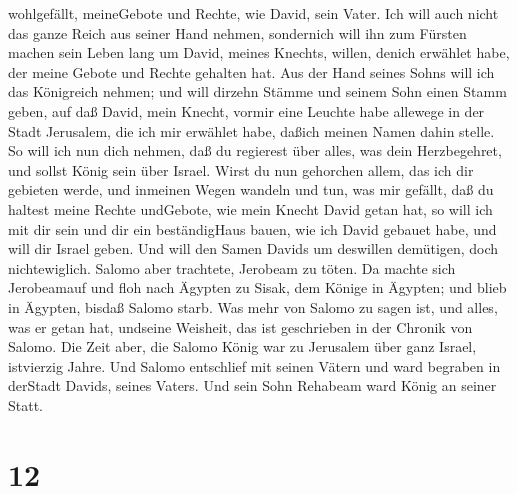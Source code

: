 wohlgefällt, meineGebote und Rechte, wie David, sein Vater.
 Ich will auch nicht das ganze Reich aus seiner Hand
nehmen, sondernich will ihn zum Fürsten machen sein Leben lang um David,
meines Knechts, willen, denich erwählet habe, der meine Gebote und
Rechte gehalten hat.  Aus der Hand seines Sohns will ich
das Königreich nehmen; und will dirzehn Stämme  und seinem
Sohn einen Stamm geben, auf daß David, mein Knecht, vormir eine Leuchte
habe allewege in der Stadt Jerusalem, die ich mir erwählet habe, daßich
meinen Namen dahin stelle.  So will ich nun dich nehmen,
daß du regierest über alles, was dein Herzbegehret, und sollst König
sein über Israel.  Wirst du nun gehorchen allem, das ich
dir gebieten werde, und inmeinen Wegen wandeln und tun, was mir gefällt,
daß du haltest meine Rechte undGebote, wie mein Knecht David getan hat,
so will ich mit dir sein und dir ein beständigHaus bauen, wie ich David
gebauet habe, und will dir Israel geben.  Und will den
Samen Davids um deswillen demütigen, doch nichtewiglich. 
Salomo aber trachtete, Jerobeam zu töten. Da machte sich Jerobeamauf und
floh nach Ägypten zu Sisak, dem Könige in Ägypten; und blieb in Ägypten,
bisdaß Salomo starb.  Was mehr von Salomo zu sagen ist, und
alles, was er getan hat, undseine Weisheit, das ist geschrieben in der
Chronik von Salomo.  Die Zeit aber, die Salomo König war zu
Jerusalem über ganz Israel, istvierzig Jahre.  Und Salomo
entschlief mit seinen Vätern und ward begraben in derStadt Davids,
seines Vaters. Und sein Sohn Rehabeam ward König an seiner Statt.

\hypertarget{section-11}{%
\section{12}\label{section-11}}


